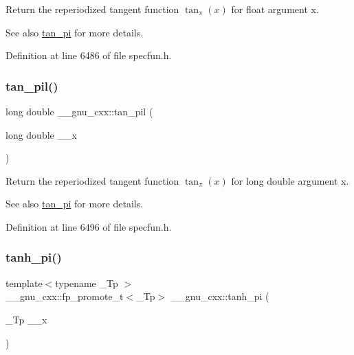Return the reperiodized tangent function $ \tan_\pi(x) $ for {\ttfamily float} argument {\ttfamily x}.

\begin{DoxySeeAlso}{See also}
\hyperlink{group__mathsf__gnu_ga12855bd62fe6a955ef0d1d5e92c85ba9}{tan\+\_\+pi} for more details. 
\end{DoxySeeAlso}


Definition at line 6486 of file specfun.\+h.

\mbox{\label{group__mathsf__gnu_ga3546906a5bb8f128c893dddef72e2f20}} 
\subsubsection{\texorpdfstring{tan\+\_\+pil()}{tan\_pil()}}
{\footnotesize\ttfamily long double \+\_\+\+\_\+gnu\+\_\+cxx\+::tan\+\_\+pil (\begin{DoxyParamCaption}\item[{long double}]{\+\_\+\+\_\+x }\end{DoxyParamCaption})\hspace{0.3cm}{\ttfamily [inline]}}

Return the reperiodized tangent function $ \tan_\pi(x) $ for {\ttfamily long double} argument {\ttfamily x}.

\begin{DoxySeeAlso}{See also}
\hyperlink{group__mathsf__gnu_ga12855bd62fe6a955ef0d1d5e92c85ba9}{tan\+\_\+pi} for more details. 
\end{DoxySeeAlso}


Definition at line 6496 of file specfun.\+h.

\mbox{\label{group__mathsf__gnu_ga8729ffd5acf3266315e9dac1b5a9b3a6}} 
\subsubsection{\texorpdfstring{tanh\+\_\+pi()}{tanh\_pi()}}
{\footnotesize\ttfamily template$<$typename \+\_\+\+Tp $>$ \\
\+\_\+\+\_\+gnu\+\_\+cxx\+::fp\+\_\+promote\+\_\+t$<$\+\_\+\+Tp$>$ \+\_\+\+\_\+gnu\+\_\+cxx\+::tanh\+\_\+pi (\begin{DoxyParamCaption}\item[{\+\_\+\+Tp}]{\+\_\+\+\_\+x }\end{DoxyParamCaption})\hspace{0.3cm}{\ttfamily [inline]}}


